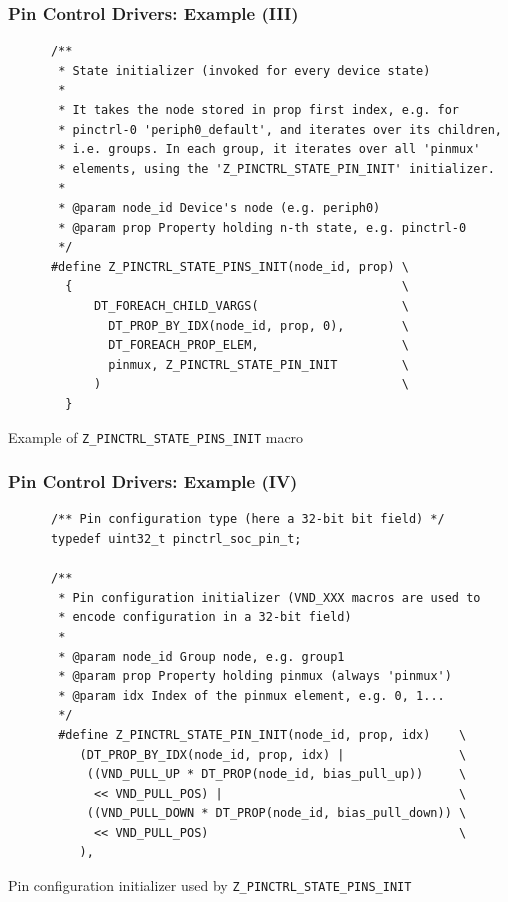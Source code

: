 \documentclass[handout]{beamer}
\begin{document}
\begin{frame}[fragile]
  \frametitle{Pin Control Drivers: Example (III)}

  \begin{listing}[H]
    \begin{verbatim}
      /**
       * State initializer (invoked for every device state)
       *
       * It takes the node stored in prop first index, e.g. for
       * pinctrl-0 'periph0_default', and iterates over its children,
       * i.e. groups. In each group, it iterates over all 'pinmux'
       * elements, using the 'Z_PINCTRL_STATE_PIN_INIT' initializer.
       *
       * @param node_id Device's node (e.g. periph0)
       * @param prop Property holding n-th state, e.g. pinctrl-0
       */
      #define Z_PINCTRL_STATE_PINS_INIT(node_id, prop) \
        {                                              \
            DT_FOREACH_CHILD_VARGS(                    \
              DT_PROP_BY_IDX(node_id, prop, 0),        \
              DT_FOREACH_PROP_ELEM,                    \
              pinmux, Z_PINCTRL_STATE_PIN_INIT         \
            )                                          \
        }
    \end{verbatim}
    \caption{Example of \texttt{Z\_PINCTRL\_STATE\_PINS\_INIT} macro}
  \end{listing}
\end{frame}

\begin{frame}[fragile]
  \frametitle{Pin Control Drivers: Example (IV)}

  \begin{listing}[H]
    \begin{verbatim}
      /** Pin configuration type (here a 32-bit bit field) */
      typedef uint32_t pinctrl_soc_pin_t;

      /**
       * Pin configuration initializer (VND_XXX macros are used to
       * encode configuration in a 32-bit field)
       *
       * @param node_id Group node, e.g. group1
       * @param prop Property holding pinmux (always 'pinmux')
       * @param idx Index of the pinmux element, e.g. 0, 1...
       */
       #define Z_PINCTRL_STATE_PIN_INIT(node_id, prop, idx)    \
          (DT_PROP_BY_IDX(node_id, prop, idx) |                \
           ((VND_PULL_UP * DT_PROP(node_id, bias_pull_up))     \
            << VND_PULL_POS) |                                 \
           ((VND_PULL_DOWN * DT_PROP(node_id, bias_pull_down)) \
            << VND_PULL_POS)                                   \
          ),
    \end{verbatim}
    \caption{Pin configuration initializer used by
      \texttt{Z\_PINCTRL\_STATE\_PINS\_INIT}}
  \end{listing}
\end{frame}
\end{document}
